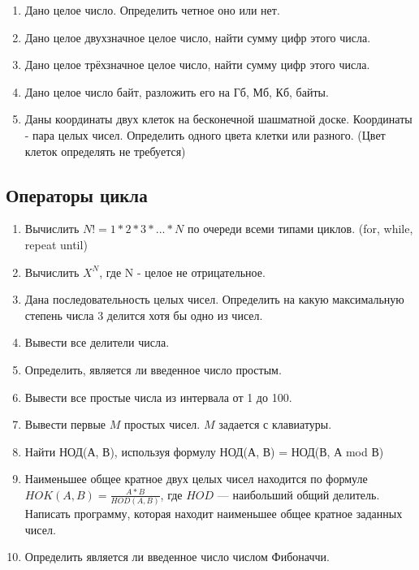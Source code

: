 \begin{enumerate}
  \item Дано целое число. Определить четное оно или нет.

  \item Дано целое двухзначное целое число, найти сумму цифр этого числа.

  \item Дано целое трёхзначное целое число, найти сумму цифр этого числа.

  \item Дано целое число байт, разложить его на Гб, Мб, Кб, байты.

  \item Даны координаты двух клеток на бесконечной шашматной доске. Координаты - пара целых чисел. Определить одного цвета клетки или разного. (Цвет клеток определять не требуется)
\end{enumerate}

\subsection{Операторы цикла}

\begin{enumerate}
  \item Вычислить $N! = 1*2*3*...*N$ по очереди всеми типами циклов. (for, while, repeat until)

  \item Вычислить $X^N$, где N - целое не отрицательное.

  \item Дана последовательность целых чисел. Определить на какую максимальную степень числа 3 делится хотя бы одно из чисел.

  \item Вывести все делители числа.

  \item Определить, является ли введенное число простым.

  \item Вывести все простые числа из интервала от 1 до 100.

  \item Вывести первые $M$ простых чисел. $M$ задается с клавиатуры.

  \item Найти НОД(А, В), используя формулу НОД(А, В) = НОД(В, А mod В)
  
  \item Наименьшее общее кратное двух целых чисел находится по формуле $HOK(A,B)=\frac{A*B}{HOD(A,B)}$, где $HOD$ --- наибольший общий делитель. Написать программу, которая находит наименьшее общее кратное заданных чисел.

  \item Определить является ли введенное число числом Фибоначчи.
\end{enumerate}

